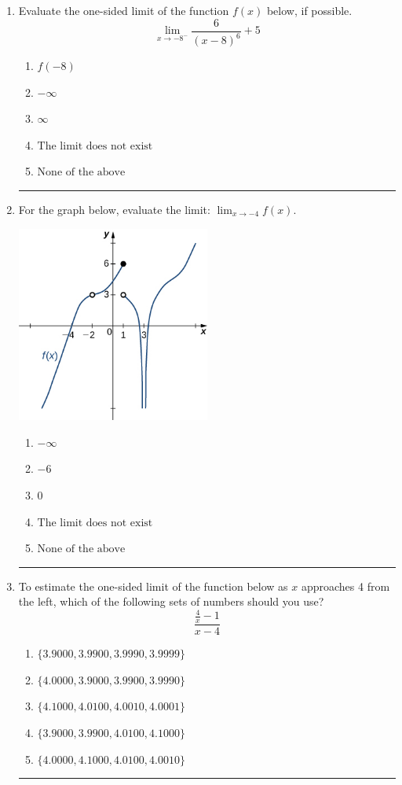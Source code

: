 \documentclass[14pt]{extbook}
\newcommand{\litem}[1]{\item#1\hspace*{-1cm}\rule{\textwidth}{0.4pt}}
\begin{document}
\begin{enumerate}
\litem{
Evaluate the one-sided limit of the function $f(x)$ below, if possible.\[ \lim_{x \rightarrow -8^-} \frac{6}{(x-8)^6}+5 \]\begin{enumerate}[label=\Alph*.]
\item \( f(-8) \)
\item \( -\infty \)
\item \( \infty \)
\item \( \text{The limit does not exist} \)
\item \( \text{None of the above} \)

\end{enumerate} }
\litem{
For the graph below, evaluate the limit: $ \displaystyle \lim_{x \rightarrow -4} f(x)$.
\begin{center}
    \includegraphics[width=0.5\textwidth]{../Figures/evaluateLimitGraphicallyC.png}
\end{center}
\begin{enumerate}[label=\Alph*.]
\item \( -\infty \)
\item \( -6 \)
\item \( 0 \)
\item \( \text{The limit does not exist} \)
\item \( \text{None of the above} \)

\end{enumerate} }
\litem{
To estimate the one-sided limit of the function below as $x$ approaches 4 from the left, which of the following sets of numbers should you use?\[ \frac{\frac{4}{x} - 1}{x - 4} \]\begin{enumerate}[label=\Alph*.]
\item \( \{ 3.9000, 3.9900, 3.9990, 3.9999 \} \)
\item \( \{ 4.0000, 3.9000, 3.9900, 3.9990 \} \)
\item \( \{ 4.1000, 4.0100, 4.0010, 4.0001 \} \)
\item \( \{ 3.9000, 3.9900, 4.0100, 4.1000 \} \)
\item \( \{ 4.0000, 4.1000, 4.0100, 4.0010 \} \)


\end{enumerate}}
\end{enumerate}
\end{document}
